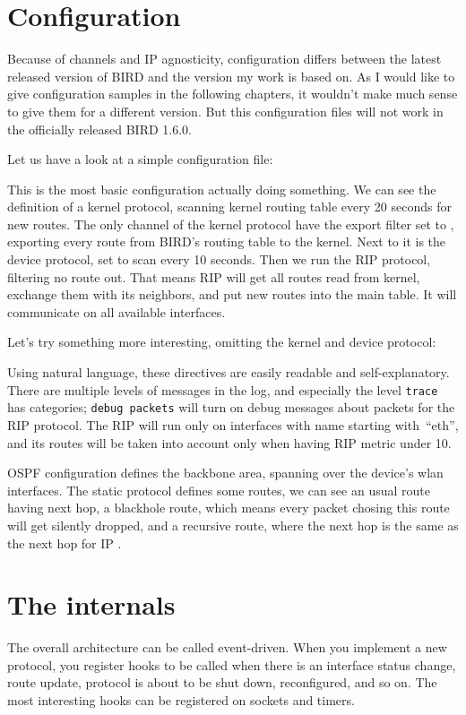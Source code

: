 \section{Configuration}
Because of channels and IP agnosticity, configuration differs between the
latest released version of BIRD and the version my work is based on. As I would
like to give configuration samples in the following chapters, it wouldn't make
much sense to give them for a different version. But this configuration files
will not work in the officially released BIRD 1.6.0.

Let us have a look at a simple configuration file:



\noindent This is the most basic configuration actually doing something. We can see the
definition of a kernel protocol, scanning kernel routing table every 20 seconds
for new routes. The only channel  of the kernel protocol have the
export filter set to , exporting every route from BIRD's routing table
 to the kernel. Next to it is the device protocol, set to scan
every 10 seconds. Then we run the RIP protocol, filtering no route out. That
means RIP will get all routes read
from kernel, exchange them with its neighbors, and put new routes into the main
table. It will communicate on all available interfaces.

\clearpage

\noindent Let's try something more interesting, omitting the kernel and device protocol:



\noindent Using natural language, these directives are easily readable and
self-explanatory. There are multiple levels of messages in the log, and
especially the level \texttt{trace} has categories; \texttt{debug packets}
will turn on debug messages about packets for the RIP protocol. The RIP will
run only on interfaces with name starting with~``eth'', and its routes will be
taken into account only when having RIP metric under 10.

OSPF configuration defines the backbone area, spanning over the device's wlan
interfaces. The static protocol defines some routes, we can see an usual route
having next hop, a blackhole route, which means every packet chosing this route
will get silently dropped, and a recursive route, where the next hop is the
same as the next hop for IP .

\section{The internals}
\label{bird-internals}
The overall architecture can be called event-driven. When you implement a new
protocol, you register hooks to be called when there is an interface status
change, route update, protocol is about to be shut down, reconfigured, and so on.
The most interesting hooks can be registered on sockets and timers.

